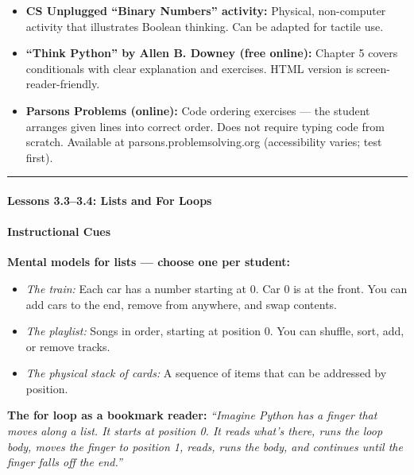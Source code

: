 \documentclass[
  justified,
  openright,
]{tufte-book}
\let\subsubsection\paragraph
\let\paragraph\paragraph
\let\subsubsection\paragraph
\let\paragraph\paragraph
\providecommand{\tightlist}{%
  \setlength{\itemsep}{0pt}\setlength{\parskip}{0pt}}
\begin{document}
\begin{itemize}
\tightlist
\item
  \textbf{CS Unplugged ``Binary Numbers'' activity:} Physical,
  non-computer activity that illustrates Boolean thinking. Can be
  adapted for tactile use.
\item
  \textbf{``Think Python'' by Allen B. Downey (free online):} Chapter 5
  covers conditionals with clear explanation and exercises. HTML version
  is screen-reader-friendly.
\item
  \textbf{Parsons Problems (online):} Code ordering exercises --- the
  student arranges given lines into correct order. Does not require
  typing code from scratch. Available at parsons.problemsolving.org
  (accessibility varies; test first).
\end{itemize}

\begin{center}\rule{0.5\linewidth}{0.5pt}\end{center}

\subsubsection{Lessons 3.3--3.4: Lists and For
Loops}\label{lessons-3.33.4-lists-and-for-loops}

\paragraph{Instructional Cues}\label{instructional-cues-8}

\textbf{Mental models for lists --- choose one per student:}

\begin{itemize}
\tightlist
\item
  \emph{The train:} Each car has a number starting at 0. Car 0 is at the
  front. You can add cars to the end, remove from anywhere, and swap
  contents.
\item
  \emph{The playlist:} Songs in order, starting at position 0. You can
  shuffle, sort, add, or remove tracks.
\item
  \emph{The physical stack of cards:} A sequence of items that can be
  addressed by position.
\end{itemize}

\textbf{The for loop as a bookmark reader:} \emph{``Imagine Python has a
finger that moves along a list. It starts at position 0. It reads what's
there, runs the loop body, moves the finger to position 1, reads, runs
the body, and continues until the finger falls off the end.''}
\end{document}
